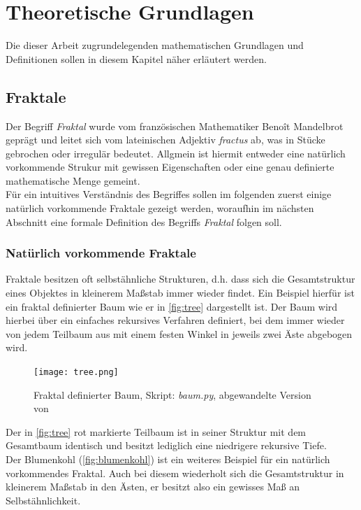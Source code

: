 \documentclass[a4paper,12pt,onesided]{report}
\begin{document}
\chapter{Theoretische Grundlagen}
Die dieser Arbeit zugrundelegenden mathematischen Grundlagen und Definitionen sollen in diesem Kapitel näher erläutert werden.

\section{Fraktale}
Der Begriff \textit{Fraktal} wurde vom französischen Mathematiker Benoît Mandelbrot geprägt und leitet sich vom lateinischen Adjektiv \textit{fractus} ab, was \glqq in Stücke gebrochen\grqq{} oder \glqq irregulär\grqq{} bedeutet. Allgmein ist hiermit entweder eine natürlich vorkommende Strukur mit gewissen Eigenschaften oder eine genau definierte mathematische Menge gemeint. \cite[S. 16]{mandelbrot2013fraktale}\\
Für ein intuitives Verständnis des Begriffes sollen im folgenden zuerst einige natürlich vorkommende Fraktale gezeigt werden, woraufhin im nächsten Abschnitt eine formale Definition des Begriffs \textit{Fraktal} folgen soll.

\subsection{Natürlich vorkommende Fraktale}
\label{sec:natfrac}
Fraktale besitzen oft selbstähnliche Strukturen, d.h. dass sich die Gesamtstruktur eines Objektes in kleinerem Maßstab immer wieder findet. Ein Beispiel hierfür ist ein fraktal definierter Baum wie er in \autoref{fig:tree} dargestellt ist. Der Baum wird hierbei über ein einfaches rekursives Verfahren definiert, bei dem immer wieder von jedem Teilbaum aus mit einem festen Winkel in jeweils zwei Äste abgebogen wird.

\begin{figure}[H]
	\centering
	\texttt{[image: tree.png]}
	\caption{Fraktal definierter Baum, Skript: \textit{baum.py}, abgewandelte Version von \cite{soTree}} %
	\label{fig:tree}
\end{figure}

Der in \autoref{fig:tree} rot markierte Teilbaum ist in seiner Struktur mit dem Gesamtbaum identisch und besitzt lediglich eine niedrigere rekursive Tiefe.\\
Der Blumenkohl (\autoref{fig:blumenkohl}) ist ein weiteres Beispiel für ein natürlich vorkommendes Fraktal. 
Auch bei diesem wiederholt sich die Gesamtstruktur in kleinerem Maßstab in den Ästen, er besitzt also ein gewisses Maß an Selbstähnlichkeit.
\end{document}
